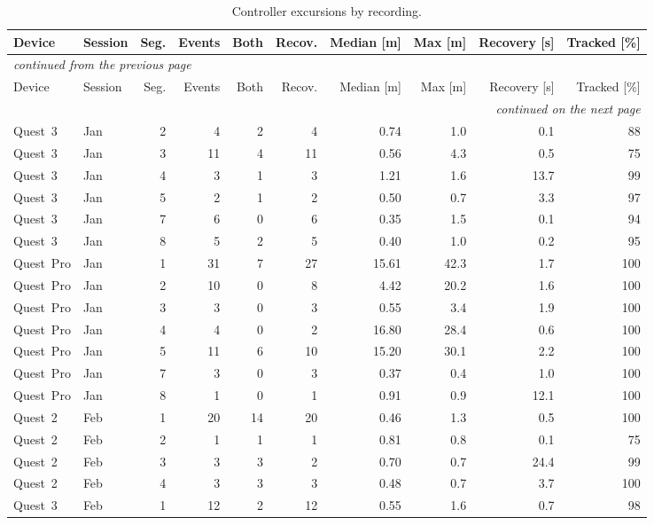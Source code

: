 \documentclass[11pt,a4paper]{article}
\begin{document}
{\footnotesize\setlength{\tabcolsep}{4pt}
\begin{longtable}{llrrrrrrrr}
\caption{Controller excursions by recording.}\label{tab:S6}\\
\toprule
Device & Session & Seg. & Events & Both & Recov. & Median [m] & Max [m] & Recovery [s] & Tracked [\%] \\
\midrule
\endfirsthead
\multicolumn{10}{l}{\footnotesize\itshape continued from the previous page}\\
\toprule
Device & Session & Seg. & Events & Both & Recov. & Median [m] & Max [m] & Recovery [s] & Tracked [\%] \\
\midrule
\endhead
\midrule
\multicolumn{10}{r}{\footnotesize\itshape continued on the next page}\\
\endfoot
\bottomrule
\endlastfoot
Quest~3 & Jan & 2 & 4 & 2 & 4 & 0.74 & 1.0 & 0.1 & 88 \\
Quest~3 & Jan & 3 & 11 & 4 & 11 & 0.56 & 4.3 & 0.5 & 75 \\
Quest~3 & Jan & 4 & 3 & 1 & 3 & 1.21 & 1.6 & 13.7 & 99 \\
Quest~3 & Jan & 5 & 2 & 1 & 2 & 0.50 & 0.7 & 3.3 & 97 \\
Quest~3 & Jan & 7 & 6 & 0 & 6 & 0.35 & 1.5 & 0.1 & 94 \\
Quest~3 & Jan & 8 & 5 & 2 & 5 & 0.40 & 1.0 & 0.2 & 95 \\
Quest~Pro & Jan & 1 & 31 & 7 & 27 & 15.61 & 42.3 & 1.7 & 100 \\
Quest~Pro & Jan & 2 & 10 & 0 & 8 & 4.42 & 20.2 & 1.6 & 100 \\
Quest~Pro & Jan & 3 & 3 & 0 & 3 & 0.55 & 3.4 & 1.9 & 100 \\
Quest~Pro & Jan & 4 & 4 & 0 & 2 & 16.80 & 28.4 & 0.6 & 100 \\
Quest~Pro & Jan & 5 & 11 & 6 & 10 & 15.20 & 30.1 & 2.2 & 100 \\
Quest~Pro & Jan & 7 & 3 & 0 & 3 & 0.37 & 0.4 & 1.0 & 100 \\
Quest~Pro & Jan & 8 & 1 & 0 & 1 & 0.91 & 0.9 & 12.1 & 100 \\
Quest~2 & Feb & 1 & 20 & 14 & 20 & 0.46 & 1.3 & 0.5 & 100 \\
Quest~2 & Feb & 2 & 1 & 1 & 1 & 0.81 & 0.8 & 0.1 & 75 \\
Quest~2 & Feb & 3 & 3 & 3 & 2 & 0.70 & 0.7 & 24.4 & 99 \\
Quest~2 & Feb & 4 & 3 & 3 & 3 & 0.48 & 0.7 & 3.7 & 100 \\
Quest~3 & Feb & 1 & 12 & 2 & 12 & 0.55 & 1.6 & 0.7 & 98 \\

\end{longtable}}
\end{document}
